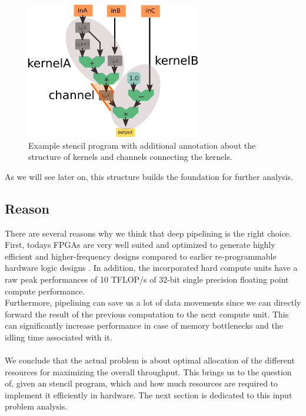 \begin{figure}[h]
	\centering
	\includegraphics[height=16em]{drawings/approach-stencil-program-pipeline-annotated.png}
	\caption{Example stencil program with additional annotation about the structure of kernels and channels connecting the kernels.}
	\label{fig:approach-stencil-program-pipeline-annotated}
\end{figure}
As we will see later on, this structure builds the foundation for further analysis.


\subsection{Reason}
There are several reasons why we think that deep pipelining is the right choice. First, todays FPGAs are very well suited and optimized to generate highly efficient and higher-frequency designs compared to earlier re-programmable hardware logic designs \cite{label55,label56}. In addition, the incorporated hard compute units have a raw peak performances of 10 TFLOP/s of 32-bit single precision floating point compute performance.\\  
Furthermore, pipelining can save us a lot of data movements since we can directly forward the result of the previous computation to the next compute unit. This can significantly increase performance in case of memory bottlenecks and the idling time associated with it.


\paragraph{}
We conclude that the actual problem is about optimal allocation of the different resources for maximizing the overall throughput. This brings us to the question of, given an stencil program, which and how much resources are required to implement it efficiently in hardware. The next section is dedicated to this input problem analysis. 





